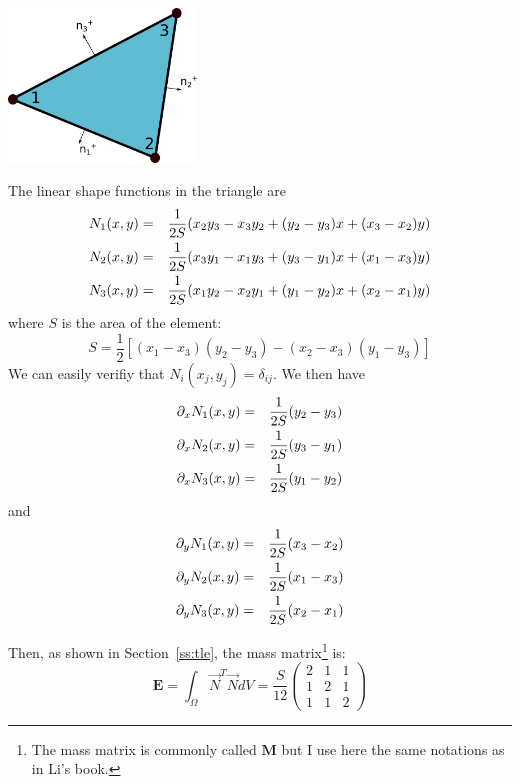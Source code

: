 
\begin{center}
\includegraphics[width=5cm]{images/dgfem/dgelts_p1}
\end{center}

The linear shape functions in the triangle are 
\begin{eqnarray}
N_1(x,y) &=& \frac{1}{2S} ( x_2y_3-x_3y_2+(y_2-y_3)x+(x_3-x_2)y   ) \nonumber\\
N_2(x,y) &=& \frac{1}{2S} ( x_3y_1-x_1y_3+(y_3-y_1)x+(x_1-x_3)y   ) \nonumber\\
N_3(x,y) &=& \frac{1}{2S} ( x_1y_2-x_2y_1+(y_1-y_2)x+(x_2-x_1)y   ) \nonumber
\end{eqnarray}
where $S$ is the area of the element:
\[
S= \frac{1}{2} [(x_1-x_3)(y_2-y_3)-(x_2-x_3)(y_1-y_3)]
\]
We can easily verifiy that $N_i(x_j,y_j)=\delta_{ij}$. We then have 
\begin{eqnarray}
\partial_x N_1(x,y) &=& \frac{1}{2S}  (y_2-y_3) \nonumber\\
\partial_x N_2(x,y) &=& \frac{1}{2S}  (y_3-y_1) \nonumber\\
\partial_x N_3(x,y) &=& \frac{1}{2S}  (y_1-y_2) \nonumber
\end{eqnarray}
and
\begin{eqnarray}
\partial_y N_1(x,y) &=& \frac{1}{2S}  (x_3-x_2) \nonumber\\
\partial_y N_2(x,y) &=& \frac{1}{2S}  (x_1-x_3) \nonumber\\
\partial_y N_3(x,y) &=& \frac{1}{2S}  (x_2-x_1) \nonumber
\end{eqnarray}

Then, as shown in Section~\ref{ss:tle}, the mass matrix\footnote{The mass matrix is commonly called ${\bm M}$ 
but I use here the same notations as in Li's book.} is:
\[
{\bm E} = \int_\Omega \vec{N}^T \vec{N} dV 
=\frac{S}{12} 
\left(
\begin{array}{ccc}
2 &1 &1\\ 
1 &2 &1\\
1 &1 &2
\end{array}
\right)
\]


